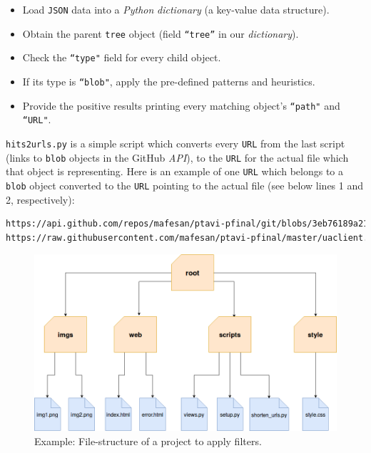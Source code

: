 \documentclass[a4paper, 12pt]{book}
\begin{document}
\begin{itemize}
  \item Load \texttt{JSON} data into a \emph{Python} \textit{dictionary} (a key-value data structure).
  \item Obtain the parent \texttt{tree} object (field \texttt{``tree''} in our \textit{dictionary}).
  \item Check the \texttt{``type"} field for every child object.
  \item If its type is \texttt{``blob"}, apply the pre-defined patterns and heuristics.
  \item Provide the positive results printing every matching object's \texttt{``path"} and \texttt{``URL"}.
\end{itemize}
\texttt{hits2urls.py} is a simple script which converts every \texttt{URL} from the last script (links to \texttt{blob} objects
in the GitHub \textit{API}), to the \texttt{URL} for the actual file which that object is representing.
Here is an example of one \texttt{URL} which belongs to a \texttt{blob} object converted to the \texttt{URL}
pointing to the actual file (see below lines 1 and 2, respectively):
\begin{lstlisting}[language=bash]
https://api.github.com/repos/mafesan/ptavi-pfinal/git/blobs/3eb76189a21a...
https://raw.githubusercontent.com/mafesan/ptavi-pfinal/master/uaclient.py \end{lstlisting}
\begin{figure}
  \centering
  \includegraphics[width=13cm, keepaspectratio]{img/file-structure-example}
  \caption{Example: File-structure of a project to apply filters.}
  \label{fig:file-structure-example}
\end{figure}
\end{document}
